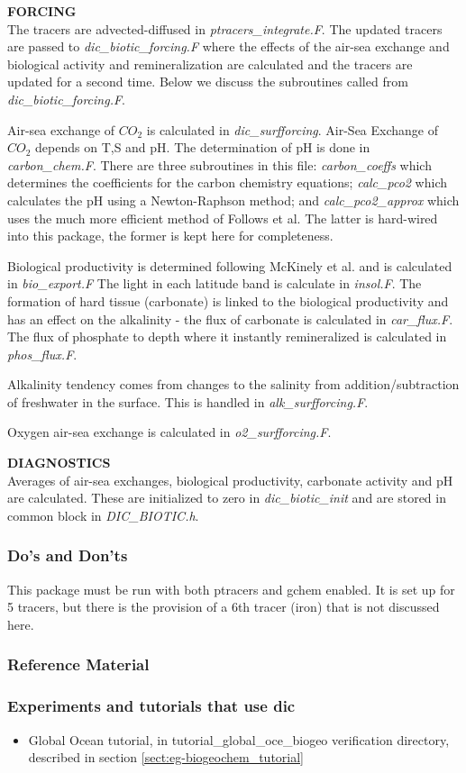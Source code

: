 \vspace{.5cm}

\noindent
{{\bf FORCING}}\\
The tracers are advected-diffused in {\it ptracers\_integrate.F}.
The updated tracers are passed to {\it dic\_biotic\_forcing.F}
where the effects of the air-sea exchange and biological
activity and remineralization are calculated and the tracers
are updated for a second time. Below we discuss the 
subroutines called from {\it dic\_biotic\_forcing.F}.


Air-sea exchange of $CO_2$ is calculated in {\it dic\_surfforcing}.
Air-Sea Exchange of $CO_2$ depends on T,S and pH. The determination
of pH is done in {\it carbon\_chem.F}. There are three subroutines
in this file: {\it carbon\_coeffs} which determines the coefficients
for the carbon chemistry equations; {\it calc\_pco2} which calculates
the pH using a Newton-Raphson method; and {\it calc\_pco2\_approx}
which uses the much more efficient method of Follows et al.
The latter is hard-wired into this package, the former is kept
here for completeness.

Biological productivity is determined following
McKinely et al. and is calculated in {\it bio\_export.F}
The light in each latitude band is calculate in {\it insol.F}.
The formation of hard tissue (carbonate) is linked to
the biological productivity and has an effect on the
alkalinity - the flux of carbonate is calculated in
{\it car\_flux.F}. The flux of phosphate to depth where
it instantly remineralized is calculated in {\it phos\_flux.F}.

Alkalinity tendency comes from changes to the salinity from
addition/subtraction of freshwater in the surface. This
is handled in {\it alk\_surfforcing.F}.

Oxygen air-sea exchange is calculated in {\it o2\_surfforcing.F}.
 
\vspace{.5cm}

\noindent
{{\bf DIAGNOSTICS}}\\
Averages of air-sea exchanges, biological productivity,
carbonate activity and pH are calculated. These are
initialized to zero in {\it dic\_biotic\_init} and
are stored in common block in {\it DIC\_BIOTIC.h}.

\subsubsection{Do's and Don'ts}

This package must be run with both ptracers and gchem enabled.
It is set up for 5 tracers, but there is the provision of
a 6th tracer (iron) that is not discussed here.

\subsubsection{Reference Material}

\subsubsection{Experiments and tutorials that use dic}
\label{sec:pkg:dic:experiments}

\begin{itemize}
\item{Global Ocean tutorial, in tutorial\_global\_oce\_biogeo verification directory, 
described in section \ref{sect:eg-biogeochem_tutorial} }
\end{itemize}

